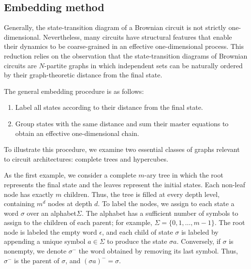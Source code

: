 \documentclass[%
 reprint,
superscriptaddress,
 amsmath,amssymb,
 aps,
 prx,
]{revtex4-2}
\begin{document}
\subsection{Embedding method}\label{sec:embedding method}
Generally, the state-transition diagram of a Brownian circuit is not strictly one-dimensional. Nevertheless, many circuits have structural features that enable their dynamics to be coarse-grained in an effective one-dimensional process. This reduction relies on the observation that the state-transition diagrams of Brownian circuits are $N$-partite graphs in which independent sets can be naturally ordered by their graph-theoretic distance from the final state.

The general embedding procedure is as follows: 
\begin{enumerate}
    \item Label all states according to their distance from the final state.
    \item Group states with the same distance and sum their master equations to obtain an effective one-dimensional chain.
\end{enumerate}
To illustrate this procedure, we examine two essential classes of graphs relevant to circuit architectures: complete trees and hypercubes.

As the first example, we consider a complete $m$-ary tree in which the root represents the final state and the leaves represent the initial states. Each non-leaf node has exactly $m$ children. Thus, the tree is filled at every depth level, containing $m^d$ nodes at depth $d$.
 To label the nodes, we assign to each state a word $\sigma$ over an alphabet$\Sigma$. The alphabet has a sufficient number of symbols to assign to the children of each parent; for example, $\Sigma=\{0,1,\ldots, m-1\}$. The root node is labeled the empty word $\epsilon$, and each child of state $\sigma$ is labeled by appending a unique symbol $a\in\Sigma$ to produce the state $\sigma a$. Conversely, if $\sigma$ is nonempty, we denote $\sigma^-$ the word obtained by removing its last symbol. Thus, $\sigma^-$ is the parent of $\sigma$, and $(\sigma a)^-=\sigma$. 
\end{document}
